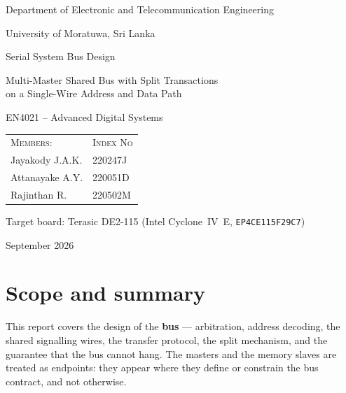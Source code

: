 \documentclass[11pt,a4paper]{article}
\begin{document}
\begin{titlepage}
\centering
\vspace*{1.2cm}

{\large Department of Electronic and Telecommunication Engineering\par}
\vspace{0.35cm}
{\large University of Moratuwa, Sri Lanka\par}

\vspace{3.0cm}

{\Huge Serial System Bus Design\par}
\vspace{0.8cm}
{\large Multi-Master Shared Bus with Split Transactions\\[0.2cm]
on a Single-Wire Address and Data Path\par}

\vspace{1.0cm}
{\large EN4021 -- Advanced Digital Systems\par}

\vspace{3.0cm}

{\renewcommand{\arraystretch}{1.15}
\begin{tabular}{ll}
\textsc{Members:} & \textsc{Index No}\\[0.15cm]
Jayakody J.A.K.   & 220247J\\
Attanayake A.Y.   & 220051D\\
Rajinthan R.      & 220502M\\
\end{tabular}}

\vfill
{Target board: Terasic DE2-115 (Intel Cyclone~IV~E, \texttt{EP4CE115F29C7})\par}
\vspace{0.2cm}
{September 2026\par}
\end{titlepage}

\newpage
\tableofcontents
\newpage

\section{Scope and summary}

This report covers the design of the \textbf{bus} --- arbitration, address
decoding, the shared signalling wires, the transfer protocol, the split
mechanism, and the guarantee that the bus cannot hang. The masters and the
memory slaves are treated as endpoints: they appear where they define or
constrain the bus contract, and not otherwise.
\end{document}
